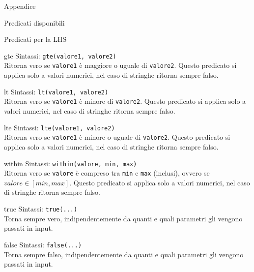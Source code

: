 \begin{chapter}{Appendice}
\begin{section}{Predicati disponibili}
\begin{subsection}{Predicati per la LHS}
		\begin{subsubsection}{gte}
		\label{sec:predicates-lhs-gte}
		Sintassi: \verb!gte(valore1, valore2)!\\
		Ritorna vero se \verb,valore1, \`e maggiore o uguale di \verb,valore2,.
		Questo predicato si applica solo a valori numerici, nel caso di stringhe ritorna
		sempre falso.
		\end{subsubsection}

		\begin{subsubsection}{lt}
		\label{sec:predicates-lhs-lt}
		Sintassi: \verb!lt(valore1, valore2)!\\
		Ritorna vero se \verb,valore1, \`e minore di \verb,valore2,. Questo
		predicato si applica solo a valori numerici, nel caso di stringhe ritorna
		sempre falso.
		\end{subsubsection}

		\begin{subsubsection}{lte}
		\label{sec:predicates-lhs-lte}
		Sintassi: \verb!lte(valore1, valore2)!\\
		Ritorna vero se \verb,valore1, \`e minore o uguale di \verb,valore2,.
		Questo predicato si applica solo a valori numerici, nel caso di stringhe ritorna
		sempre falso.
		\end{subsubsection}

		\begin{subsubsection}{within}
		\label{sec:predicates-lhs-within}
		Sintassi: \verb!within(valore, min, max)!\\
		Ritorna vero se \verb,valore, \`e compreso tra \verb,min, e \verb,max, (inclusi),
		ovvero se $ valore \in [ min, max ] $.
		Questo predicato si applica solo a valori numerici, nel caso di stringhe ritorna
		sempre falso.
		\end{subsubsection}

		\begin{subsubsection}{true}
		\label{sec:predicates-lhs-true}
		Sintassi: \verb!true(...)!\\
		Torna sempre vero, indipendentemente da quanti e quali parametri gli vengono 
		passati in input.
		\end{subsubsection}

		\begin{subsubsection}{false}
		\label{sec:predicates-lhs-false}
		Sintassi: \verb!false(...)!\\
		Torna sempre falso, indipendentemente da quanti e quali parametri gli vengono 
		passati in input.
		\end{subsubsection}


\end{subsection}
\end{section}
\end{chapter}
